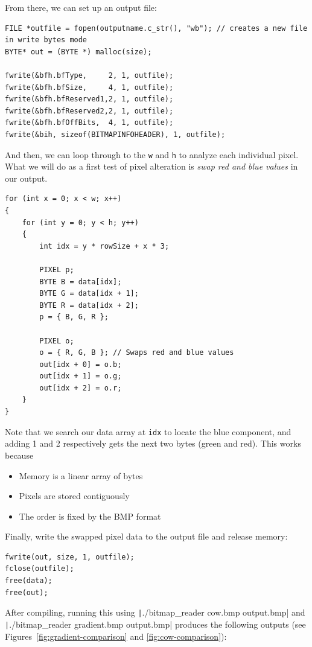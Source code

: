From there, we can set up an output file:
\begin{verbatim}
FILE *outfile = fopen(outputname.c_str(), "wb"); // creates a new file in write bytes mode
BYTE* out = (BYTE *) malloc(size);

fwrite(&bfh.bfType,     2, 1, outfile);
fwrite(&bfh.bfSize,     4, 1, outfile);
fwrite(&bfh.bfReserved1,2, 1, outfile);
fwrite(&bfh.bfReserved2,2, 1, outfile);
fwrite(&bfh.bfOffBits,  4, 1, outfile);
fwrite(&bih, sizeof(BITMAPINFOHEADER), 1, outfile);
\end{verbatim}

And then, we can loop through to the \texttt{w} and \texttt{h} to analyze each individual pixel. What we will do as a first test of pixel alteration is \emph{swap red and blue values} in our output.

\begin{verbatim}
for (int x = 0; x < w; x++)
{
    for (int y = 0; y < h; y++)
    {
        int idx = y * rowSize + x * 3;

        PIXEL p;
        BYTE B = data[idx];
        BYTE G = data[idx + 1];
        BYTE R = data[idx + 2];
        p = { B, G, R };

        PIXEL o;
        o = { R, G, B }; // Swaps red and blue values
        out[idx + 0] = o.b; 
        out[idx + 1] = o.g; 
        out[idx + 2] = o.r;
    }
}
\end{verbatim}

Note that we search our data array at \texttt{idx} to locate the blue component, and adding 1 and 2 respectively gets the next two bytes (green and red). This works because
\begin{itemize}
\item Memory is a linear array of bytes
\item Pixels are stored contiguously
\item The order is fixed by the BMP format
\end{itemize}

Finally, write the swapped pixel data to the output file and release memory:
\begin{verbatim}
fwrite(out, size, 1, outfile);
fclose(outfile);
free(data);
free(out);
\end{verbatim}

After compiling, running this using \texttt|./bitmap_reader cow.bmp output.bmp| and \texttt|./bitmap_reader gradient.bmp output.bmp| produces the following outputs (see Figures~\ref{fig:gradient-comparison} and \ref{fig:cow-comparison}):

